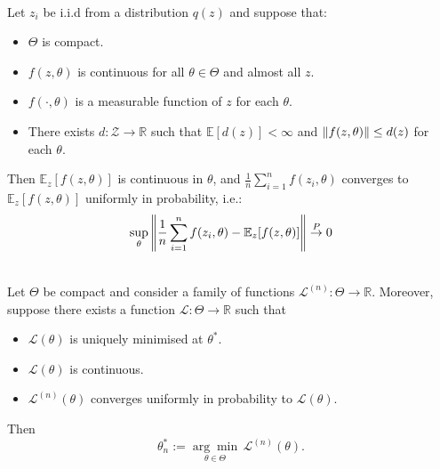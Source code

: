 \begin{lemma} \cite[Lemma 2.4]{whitney1994estimation} \\
    \label{ch2:lemma:ULLN}
    Let $z_i$ be i.i.d from a distribution $q(z)$ and suppose that:
    \begin{itemize}
        \item $\Theta$ is compact.
        \item $f(z,\theta)$ is continuous for all $\theta \in \Theta$ and almost all $z$.
        \item $f(\cdot, \theta)$ is a measurable function of $z$ for each $\theta$.
        \item There exists $d: \mathcal{Z} \xrightarrow{} \mathbb{R}$ such that $\mathbb{E}[d(z)]<\infty$ and $\left\lVert f(z,\theta) \right\rVert \leq d(z)$ for each $\theta$.
    \end{itemize}
    Then $\mathbb{E}_{z}[f(z,\theta)]$ is continuous in $\theta$, and $\frac{1}{n}\sum_{i=1}^n f(z_i, \theta)$ converges to $\mathbb{E}_{z}[f(z,\theta)]$ uniformly in probability, i.e.:
    \begin{gather*}
        \sup_\theta \left\lVert \frac{1}{n}\sum_{i=1}^n f(z_i, \theta) - \mathbb{E}_{z}[f(z,\theta)] \right\rVert \overset{P}{\to} 0
    \end{gather*}

\end{lemma}

\begin{lemma} \cite[Theorem 2.1]{whitney1994estimation} \\
    \label{ch2:lemma:consistency}
    Let $\Theta$ be compact and consider a family of functions $\mathcal{L}^{(n)}: \Theta \to \mathbb{R}$. Moreover, suppose there exists a function $\mathcal{L}: \Theta \to \mathbb{R}$ such that
    \begin{itemize}
        \item $\mathcal{L}(\theta)$ is uniquely minimised at $\theta^\ast$.
        \item $\mathcal{L}(\theta)$ is continuous.
        \item $\mathcal{L}^{(n)}(\theta)$ converges uniformly in probability to $\mathcal{L}(\theta)$.
    \end{itemize}
    Then $$\theta^\ast_n := \underset{\theta \in \Theta}{\arg\min} \, \mathcal{L}^{(n)}(\theta).$$
\end{lemma}


